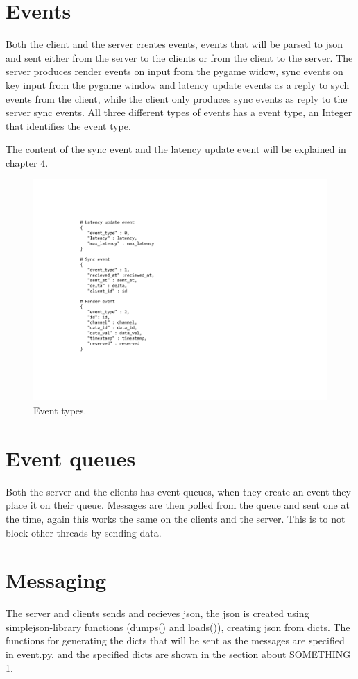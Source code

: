 \section{Events}
Both the client and the server creates events, events that will be parsed to json and sent either from the server to the clients or from the client to the server. The server produces render events on input from the pygame widow, sync events on key input from the pygame window and latency update events as a reply to sych events from the client, while the client only produces sync events as reply to the server sync events. All three different types of events has a event type, an Integer that identifies the event type.

The content of the sync event and the latency update event will be explained in chapter 4. 

\begin{figure}[h!]
\centering
\includegraphics[width=1.3\textwidth]{figures/events.png}
\caption{Event types.}
\label{events}
\end{figure}

\section{Event queues}
Both the server and the clients has event queues, when they create an event they place it on their queue. Messages are then polled from the queue and sent one at the time, again this works the same on the clients and the server. This is to not block other threads by sending data. 

\section{Messaging}
The server and clients sends and recieves json, the json is created using simplejson-library functions (dumps() and loads()), creating json from dicts. The functions for generating the dicts that will be sent as the messages are specified in event.py, and the specified dicts are shown in the section about SOMETHING \ref{events}. 

